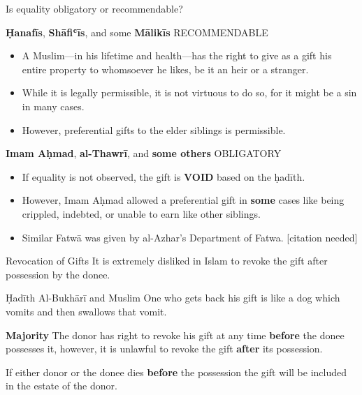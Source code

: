 \begin{frame}
Is equality obligatory or recommendable?

\textbf{Ḥanafīs}, \textbf{Shāfiʿīs}, and some \textbf{Mālikīs} \alert{RECOMMENDABLE}
\begin{itemize}
\item A Muslim---in his lifetime and health---has the right to give as a gift his entire property to whomsoever he likes, be it an heir or a stranger.
\item While it is legally permissible, it is not virtuous to do so, for it might be a sin in many cases.
\item However, preferential gifts to the elder siblings is permissible.
\end{itemize}
\end{frame}

\begin{frame}
\textbf{Imam Aḥmad}, \textbf{al-Thawrī}, and \textbf{some others} \alert{OBLIGATORY}
\begin{itemize}
\item If equality is not observed, the gift is \textbf{VOID} based on the ḥadīth.
\item However, Imam Aḥmad allowed a preferential gift in \textbf{some} cases like being \alert{crippled}, \alert{indebted}, or \alert{unable to earn} like other siblings.
\item Similar Fatwā was given by al-Azhar's Department of Fatwa. [citation needed]

\end{itemize}
\end{frame}

\begin{frame}{Revocation of Gifts}
It is extremely disliked in Islam to revoke the gift after possession by the donee.

\begin{block}{Ḥadīth \hfill Al-Bukhārī and Muslim}
One who gets back his gift is like a dog which vomits and then swallows that vomit.
\end{block}

\textbf{Majority} The donor has right to revoke his gift at any time \textbf{before} the donee possesses it, however, it is \alert{unlawful} to revoke the gift \textbf{after} its possession.

If either donor or the donee dies \textbf{before} the possession the gift will be included in the estate of the \alert{donor}.
\end{frame}

